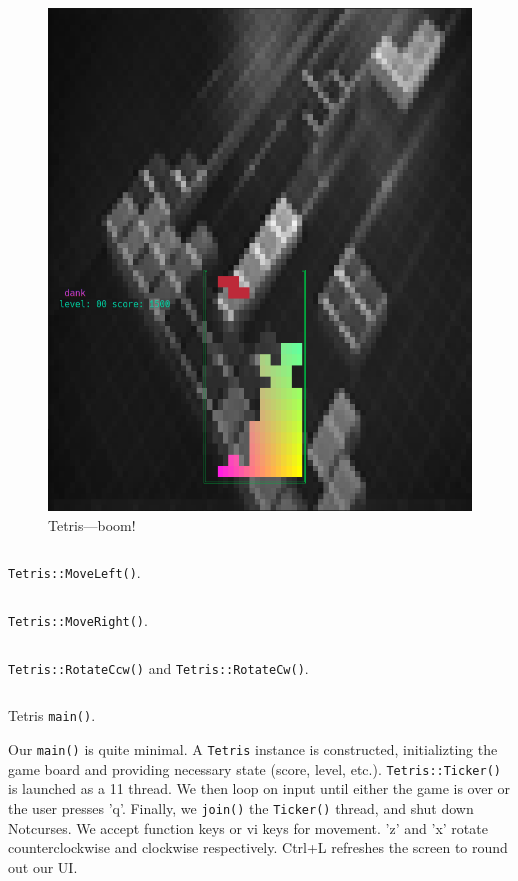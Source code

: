 \begin{figure}
\begin{minipage}{0.45\textwidth}
    \includegraphics[width=1\linewidth]{media/tetris-postscore.png}
    \caption{Tetris---boom!}
  \end{minipage}
\end{figure}

\begin{listing}[!htb]
\inputminted[]{C}{code-tetris/moveleft.h}
\caption{\texttt{Tetris::MoveLeft()}.}
\label{list:tetris-moveleft}
\end{listing}

\begin{listing}[!htb]
\inputminted[]{C}{code-tetris/moveright.h}
\caption{\texttt{Tetris::MoveRight()}.}
\label{list:tetris-moveright}
\end{listing}

\begin{listing}[!htb]
\inputminted[]{C}{code-tetris/rotate.h}
\caption{\texttt{Tetris::RotateCcw()} and \texttt{Tetris::RotateCw()}.}
\label{list:tetris-rotate}
\end{listing}

\begin{listing}[!htb]
\inputminted[]{C}{code-tetris/main.h}
\caption[]{Tetris \texttt{main()}.}
\label{list:tetris-main}
\end{listing}

Our \texttt{main()} is quite minimal. A \texttt{Tetris} instance is
constructed, initializting the game board and providing necessary state (score,
level, etc.). \texttt{Tetris::Ticker()} is launched as a {\CC}11 thread. We
then loop on input until either the game is over or the user presses 'q'.
Finally, we \texttt{join()} the \texttt{Ticker()} thread, and shut down
Notcurses. We accept function keys or vi keys for movement. 'z' and 'x' rotate
counterclockwise and clockwise respectively. Ctrl+L refreshes the screen to
round out our UI.
